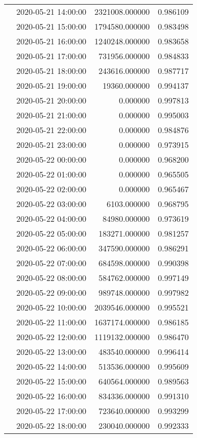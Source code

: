 \begin{tabular}{llrr}
 & 2020-05-21 14:00:00 & 2321008.000000 & 0.986109 \\
 & 2020-05-21 15:00:00 & 1794580.000000 & 0.983498 \\
 & 2020-05-21 16:00:00 & 1240248.000000 & 0.983658 \\
 & 2020-05-21 17:00:00 & 731956.000000 & 0.984833 \\
 & 2020-05-21 18:00:00 & 243616.000000 & 0.987717 \\
 & 2020-05-21 19:00:00 & 19360.000000 & 0.994137 \\
 & 2020-05-21 20:00:00 & 0.000000 & 0.997813 \\
 & 2020-05-21 21:00:00 & 0.000000 & 0.995003 \\
 & 2020-05-21 22:00:00 & 0.000000 & 0.984876 \\
 & 2020-05-21 23:00:00 & 0.000000 & 0.973915 \\
 & 2020-05-22 00:00:00 & 0.000000 & 0.968200 \\
 & 2020-05-22 01:00:00 & 0.000000 & 0.965505 \\
 & 2020-05-22 02:00:00 & 0.000000 & 0.965467 \\
 & 2020-05-22 03:00:00 & 6103.000000 & 0.968795 \\
 & 2020-05-22 04:00:00 & 84980.000000 & 0.973619 \\
 & 2020-05-22 05:00:00 & 183271.000000 & 0.981257 \\
 & 2020-05-22 06:00:00 & 347590.000000 & 0.986291 \\
 & 2020-05-22 07:00:00 & 684598.000000 & 0.990398 \\
 & 2020-05-22 08:00:00 & 584762.000000 & 0.997149 \\
 & 2020-05-22 09:00:00 & 989748.000000 & 0.997982 \\
 & 2020-05-22 10:00:00 & 2039546.000000 & 0.995521 \\
 & 2020-05-22 11:00:00 & 1637174.000000 & 0.986185 \\
 & 2020-05-22 12:00:00 & 1119132.000000 & 0.986470 \\
 & 2020-05-22 13:00:00 & 483540.000000 & 0.996414 \\
 & 2020-05-22 14:00:00 & 513536.000000 & 0.995609 \\
 & 2020-05-22 15:00:00 & 640564.000000 & 0.989563 \\
 & 2020-05-22 16:00:00 & 834336.000000 & 0.991310 \\
 & 2020-05-22 17:00:00 & 723640.000000 & 0.993299 \\
 & 2020-05-22 18:00:00 & 230040.000000 & 0.992333 \\

\end{tabular}
